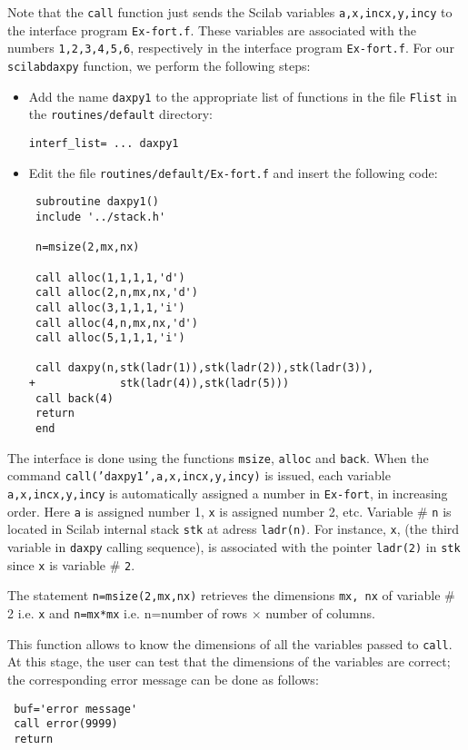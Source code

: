 Note that the {\tt call} function just sends the Scilab variables
{\tt a,x,incx,y,incy} to the interface program {\tt Ex-fort.f}.
These variables are associated with the numbers {\tt 1,2,3,4,5,6}, 
respectively in the interface program {\tt Ex-fort.f}.
\noindent
For our {\tt scilabdaxpy} function, we perform the following steps:
\begin{itemize}
\item Add the name {\tt daxpy1} to the appropriate list of functions 
in the file {\tt Flist} in the {\tt routines/default} directory:
\begin{verbatim}
interf_list= ... daxpy1
\end{verbatim}
\item Edit the file {\tt routines/default/Ex-fort.f} and
insert the following code:
\begin{verbatim}
 subroutine daxpy1()
 include '../stack.h'

 n=msize(2,mx,nx)

 call alloc(1,1,1,1,'d')
 call alloc(2,n,mx,nx,'d')
 call alloc(3,1,1,1,'i')
 call alloc(4,n,mx,nx,'d')
 call alloc(5,1,1,1,'i')

 call daxpy(n,stk(ladr(1)),stk(ladr(2)),stk(ladr(3)),
+             stk(ladr(4)),stk(ladr(5)))
 call back(4)
 return
 end
\end{verbatim}
\end{itemize}

The interface is done using the functions {\tt msize}, {\tt alloc} and
{\tt back}. When the command {\tt call('daxpy1',a,x,incx,y,incy)}
is issued, each variable {\tt a,x,incx,y,incy} is automatically
assigned a number in {\tt Ex-fort}, in increasing order.
Here {\tt a} is assigned number 1, {\tt x} is assigned number 2, etc. 
Variable \# {\tt n} is located in Scilab internal stack {\tt stk} at 
adress {\tt ladr(n)}. For instance, {\tt x}, (the third variable in {\tt daxpy}
calling sequence), is associated with the pointer {\tt ladr(2)} in 
{\tt stk} since {\tt x} is variable \# {\tt 2}. 



The statement {\tt n=msize(2,mx,nx)} retrieves the dimensions
{\tt mx, nx} of variable \# 2 i.e. {\tt x} and {\verb!n=mx*mx!} i.e. 
n=number of rows $\times$ number of columns.

 This function allows to
know the dimensions of all the variables passed to {\tt call}.
At this stage, the user can test that the dimensions of the variables
are correct; the corresponding error message can be done as follows:
\begin{verbatim}
 buf='error message'
 call error(9999)
 return
\end{verbatim}

